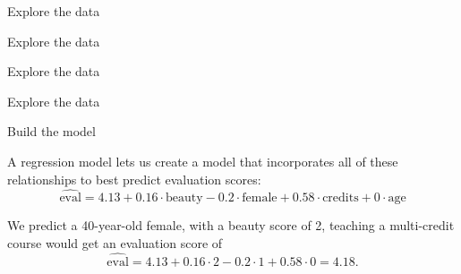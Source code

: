 \documentclass{beamer}\usepackage[]{graphicx}\usepackage[]{color}
\newenvironment{knitrout}{}{} %
\begin{document}
\begin{darkframes}
\begin{frame}{Explore the data}
\begin{knitrout}
\end{knitrout}
    \end{frame}

    \begin{frame}{Explore the data}
\begin{knitrout}


\end{knitrout}
    \end{frame}

    \begin{frame}{Explore the data}
\begin{knitrout}


\end{knitrout}
    \end{frame}

    \begin{frame}{Explore the data}
\begin{knitrout}


\end{knitrout}
    \end{frame}

    \begin{frame}{Build the model}
      
      \begin{center}
        A regression model lets us create a model that incorporates all of these relationships to best predict evaluation scores:
        \[
          \widehat{\text{eval}} =
            4.13 +
            0.16 \cdot \text{beauty} -
            0.2 \cdot \text{female} +
            0.58 \cdot \text{credits} +
            0 \cdot \text{age}
        \]

        \pause

        We predict a 40-year-old female, with a beauty score of 2, teaching a multi-credit course would get an evaluation score of
        \[
          \widehat{\text{eval}} = 4.13 + 0.16 \cdot 2 - 0.2 \cdot 1 + 0.58 \cdot 0 = 4.18.
        \]


\end{center}
\end{frame}
\end{darkframes}
\end{document}
